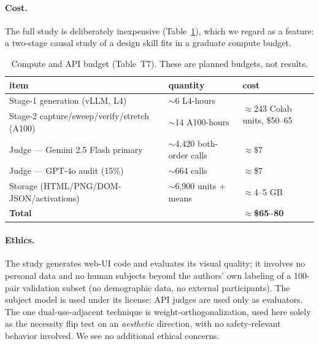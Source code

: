 \paragraph{Cost.} The full study is deliberately inexpensive (Table~\ref{tab:cost}), which we regard
as a feature: a two-stage causal study of a design skill fits in a graduate compute budget.

\begin{table}[htbp]
\centering\footnotesize
\caption{Compute and API budget (Table~T7). These are planned budgets, not results.}
\label{tab:cost}
\begin{tabular}{@{}lll@{}}
\toprule
item & quantity & cost \\
\midrule
Stage-1 generation (vLLM, L4) & $\sim$6 L4-hours & \multirow{2}{*}{$\approx$243 Colab units, \$50--65} \\
Stage-2 capture/sweep/verify/stretch (A100) & $\sim$14 A100-hours & \\
Judge --- Gemini 2.5 Flash primary & $\sim$4{,}420 both-order calls & $\approx$\$7 \\
Judge --- GPT-4o audit (15\%) & $\sim$664 calls & $\approx$\$7 \\
Storage (HTML/PNG/DOM-JSON/activations) & $\sim$6{,}900 units + means & $\approx$4--5 GB \\
\midrule
\textbf{Total} & & \textbf{$\approx$\$65--80} \\
\bottomrule
\end{tabular}
\end{table}

\paragraph{Ethics.} The study generates web-UI code and evaluates its visual quality; it involves no
personal data and no human subjects beyond the authors' own labeling of a 100-pair validation subset
(no demographic data, no external participants). The subject model is used under its license; API
judges are used only as evaluators. The one dual-use-adjacent technique is weight-orthogonalization,
used here solely as the necessity flip test on an \emph{aesthetic} direction, with no safety-relevant
behavior involved. We see no additional ethical concerns.
